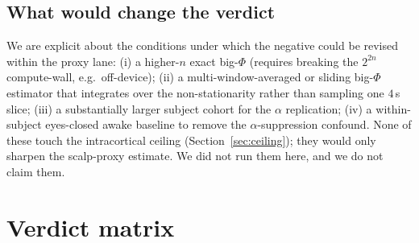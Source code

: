 \documentclass[11pt,a4paper]{article}
\begin{document}
\subsection{What would change the verdict}
We are explicit about the conditions under which the negative could be revised
within the proxy lane: (i) a higher-$n$ exact big-$\Phi$ (requires breaking the
$2^{2n}$ compute-wall, e.g.\ off-device); (ii) a multi-window-averaged or
sliding big-$\Phi$ estimator that integrates over the non-stationarity rather
than sampling one $4\,$s slice; (iii) a substantially larger subject cohort for
the $\alpha$ replication; (iv) a within-subject eyes-closed awake baseline to
remove the $\alpha$-suppression confound. None of these touch the intracortical
ceiling (Section~\ref{sec:ceiling}); they would only sharpen the scalp-proxy
estimate. We did not run them here, and we do not claim them.

\section{Verdict matrix}\label{sec:verdicts}
\end{document}
